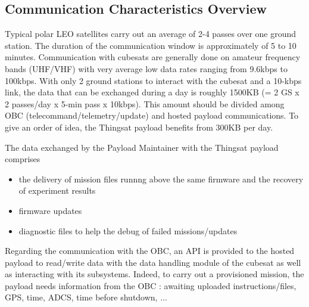 \subsection{Communication Characteristics Overview}

Typical polar LEO satellites carry out an average of 2-4 passes over one ground
station. The duration of the communication window is approximately of 5 to 10
minutes. Communication with cubesats are generally done on amateur frequency
bands (UHF/VHF) with very average low data rates ranging from 9.6kbps to
100kbps. With only 2 ground stations to interact with the cubesat and a 10-kbps
link, the data that can be exchanged during a day is roughly 1500KB (= 2 GS x 2
passes/day x 5-min pass x 10kbps). This amount should be divided among OBC
(telecommand/telemetry/update) and hosted payload communications. To give an
order of idea, the Thingsat payload benefits from 300KB per day. 

The data exchanged by the Payload Maintainer with the Thingsat payload comprises 
\begin{itemize}
    \item the delivery of mission files runnng above the same firmware and the
    recovery of experiment results
    \item firmware updates
    \item diagnostic files to help the debug of failed missions/updates
\end{itemize} 



Regarding the communication with the OBC, an API is provided to the hosted
payload to read/write data with the data handling module of the cubesat as well
as interacting with its subsystems. Indeed, to carry out a provisioned mission,
the payload needs information from the OBC : awaiting uploaded
instructions/files, GPS, time, ADCS, time before shutdown, ...

